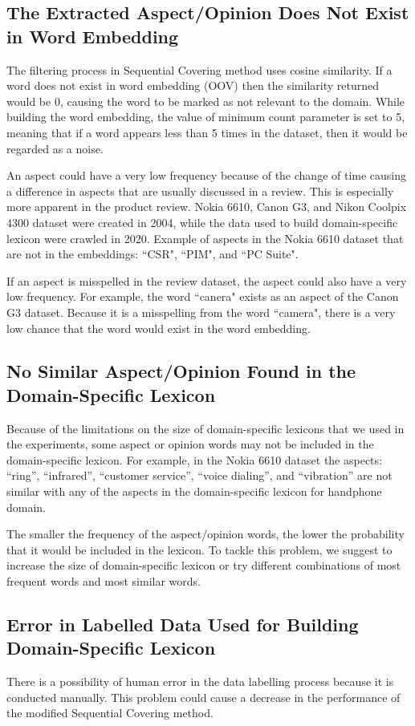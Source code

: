 \documentclass[a4paper,conference]{IEEEtran}
\begin{document}
\subsection{The Extracted Aspect/Opinion Does Not Exist in Word Embedding}
The filtering process in Sequential Covering method uses cosine similarity. If a word does not exist in word embedding (OOV) then the similarity returned would be 0, causing the word to be marked as not relevant to the domain. While building the word embedding, the value of minimum count parameter is set to 5, meaning that if a word appears less than 5 times in the dataset, then it would be regarded as a noise.

An aspect could have a very low frequency because of the change of time causing a difference in aspects that are usually discussed in a review. This is especially more apparent in the product review. Nokia 6610, Canon G3, and Nikon Coolpix 4300 dataset were created in 2004, while the data used to build domain-specific lexicon were crawled in 2020. Example of aspects in the Nokia 6610 dataset that are not in the embeddings: ``CSR", ``PIM", and ``PC Suite".

If an aspect is misspelled in the review dataset, the aspect could also have a very low frequency. For example, the word ``canera" exists as an aspect of the Canon G3 dataset. Because it is a misspelling from the word ``camera", there is a very low chance that the word would exist in the word embedding.

\subsection{No Similar Aspect/Opinion Found in the Domain-Specific Lexicon}
Because of the limitations on the size of domain-specific lexicons that we used in the experiments, some aspect or opinion words may not be included in the domain-specific lexicon. For example, in the Nokia 6610 dataset the aspects: “ring”, “infrared”, “customer service”, “voice dialing”, and “vibration” are not similar with any of the aspects in the domain-specific lexicon for handphone domain.

The smaller the frequency of the aspect/opinion words, the lower the probability that it would be included in the lexicon. To tackle this problem, we suggest to increase the size of domain-specific lexicon or try different combinations of most frequent words and most similar words.

\subsection{Error in Labelled Data Used for Building Domain-Specific Lexicon}
There is a possibility of human error in the data labelling process because it is conducted manually. This problem could cause a decrease in the performance of the modified Sequential Covering method.
\end{document}
